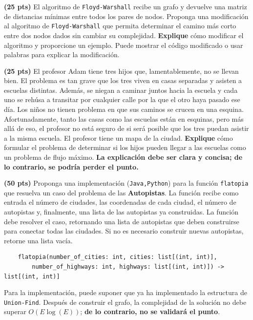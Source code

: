 \documentclass[12pt, a4paper]{exam}
\begin{document}
\begin{questions}
	\pointsdroppedatright
	\question \textbf{(25 pts)} El algoritmo de \verb|Floyd-Warshall| recibe un grafo y
	devuelve una matriz de distancias mínimas entre todos los pares de nodos. Proponga una
	modificación al algoritmo de \verb|Floyd-Warshall| que permita determinar el camino
	más corto entre dos nodos dados sin cambiar su complejidad. \textbf{Explique} cómo
	modificar el algoritmo y proporcione un ejemplo. Puede mostrar el código modificado o
	usar palabras para explicar la modificación.

	\question \textbf{(25 pts)} El profesor Adam tiene tres hijos que, lamentablemente, no
	se llevan bien. El problema es tan grave que los tres viven en casas separadas y
	asisten a escuelas distintas. Además, se niegan a caminar juntos hacia la escuela y
	cada uno se rehúsa a transitar por cualquier calle por la que el otro haya pasado ese
	día. Los niños no tienen problema en que sus caminos se crucen en una esquina.
	Afortunadamente, tanto las casas como las escuelas están en esquinas, pero más allá de
	eso, el profesor no está seguro de si será posible que los tres puedan asistir a la
	misma escuela. El profesor tiene un mapa de la ciudad. \textbf{Explique} cómo formular
	el problema de determinar si los hijos pueden llegar a las escuelas como un problema
	de flujo máximo.
	\textbf{La explicación debe ser clara y concisa; de lo contrario, se podría perder el punto.}

	\question \textbf{(50 pts)} Proponga una implementación (\texttt{Java,Python}) para la
	función \verb|flatopia| que resuelva un caso del problema de las \textbf{Autopistas}.
	La función recibe como entrada el número de ciudades, las coordenadas de cada ciudad,
	el número de autopistas y, finalmente, una lista de las autopistas ya construidas. La
	función debe resolver el caso, retornando una lista de autopistas que deben
	construirse para conectar todas las ciudades. Si no es necesario construir nuevas
	autopistas, retorne una lista vacía.

	\begin{lstlisting}
	flatopia(number_of_cities: int, cities: list[(int, int)], 
		number_of_highways: int, highways: list[(int, int)]) -> list[(int, int)]
	\end{lstlisting}

	Para la implementación, puede suponer que ya ha implementado la estructura de
	\verb|Union-Find|. Después de construir el grafo, la complejidad de la solución no
	debe superar $O(E \log(E))$; \textbf{de lo contrario, no se validará el punto}.

	

\end{questions}

\end{document}
